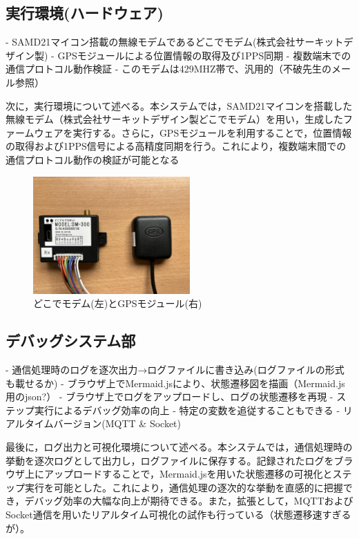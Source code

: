 \documentclass[paper]{ieicej}
\begin{document}
\subsection{実行環境(ハードウェア)}
- SAMD21マイコン搭載の無線モデムであるどこでモデム(株式会社サーキットデザイン製)
- GPSモジュールによる位置情報の取得及び1PPS同期
- 複数端末での通信プロトコル動作検証
- このモデムは429MHZ帯で、汎用的（不破先生のメール参照）

次に，実行環境について述べる。本システムでは，SAMD21マイコンを搭載した無線モデム（株式会社サーキットデザイン製どこでモデム）を用い，生成したファームウェアを実行する。さらに，GPSモジュールを利用することで，位置情報の取得および1PPS信号による高精度同期を行う。これにより，複数端末間での通信プロトコル動作の検証が可能となる
\begin{figure}[tb]
  \centering
  \includegraphics[width=60mm]{./images/devices.jpg}
  \caption{どこでモデム(左)とGPSモジュール(右)}
  \label{fig:system}
\end{figure}

\subsection{デバッグシステム部}
- 通信処理時のログを逐次出力→ログファイルに書き込み(ログファイルの形式も載せるか)
- ブラウザ上でMermaid.jsにより、状態遷移図を描画（Mermaid.js用のjson?）
- ブラウザ上でログをアップロードし、ログの状態遷移を再現
- ステップ実行によるデバッグ効率の向上
- 特定の変数を追従することもできる
- リアルタイムバージョン(MQTT \& Socket)

最後に，ログ出力と可視化環境について述べる。本システムでは，通信処理時の挙動を逐次ログとして出力し，ログファイルに保存する。記録されたログをブラウザ上にアップロードすることで，Mermaid.jsを用いた状態遷移の可視化とステップ実行を可能とした。これにより，通信処理の逐次的な挙動を直感的に把握でき，デバッグ効率の大幅な向上が期待できる。また，拡張として，MQTTおよびSocket通信を用いたリアルタイム可視化の試作も行っている（状態遷移速すぎるが）。
\end{document}

